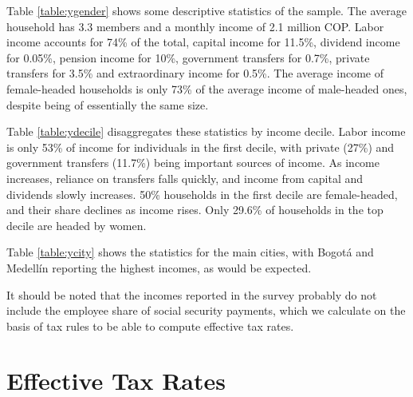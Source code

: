 \documentclass[12pt]{article}
\begin{document}
\iffalse
[[AN ECONOMIST:
    Double-check each of these figures
    against the table it comes from.]]
[[JEFF:
    Since the underlying data is cleaner now,
    either regenerate the table
    or verify that the Makefile regenerates it.]]
\fi

Table \ref{table:ygender} shows some descriptive statistics of the sample.
The average household has 3.3 members and a monthly income of 2.1 million COP.
Labor income accounts for 74\% of the total,
capital income for 11.5\%,
dividend income for 0.05\%,
pension income for 10\%,
government transfers for 0.7\%,
private transfers for 3.5\%
and extraordinary income for 0.5\%.
The average income of female-headed households
is only 73\% of the average income of male-headed ones,
despite being of essentially the same size.

Table \ref{table:ydecile} disaggregates these statistics by income decile.
Labor income is only 53\% of income for individuals in the first decile,
with private (27\%) and government transfers (11.7\%)
being important sources of income.
As income increases, reliance on transfers falls quickly,
and income from capital and dividends slowly increases.
50\% households in the first decile are female-headed,
and their share declines as income rises.
Only 29.6\% of households in the top decile are headed by women.

Table \ref{table:ycity} shows the statistics for the main cities,
with Bogotá and Medellín reporting the highest incomes, as would be expected.

It should be noted that the incomes reported in the survey
probably do not include the employee share of social security payments,
which we calculate on the basis of tax rules
to be able to compute effective tax rates.

\section{Effective Tax Rates}
\end{document}
